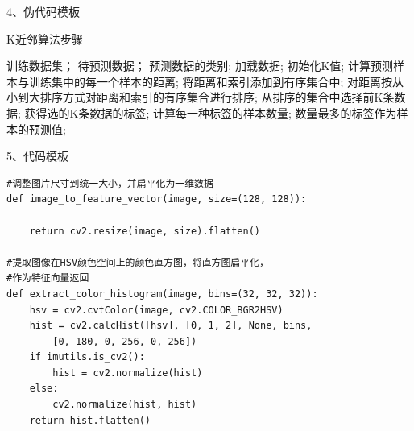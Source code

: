 \documentclass{article}
\begin{document}
\begin{appendices}
4、伪代码模板
 \begin{algorithm}[H]
  \caption{ K近邻算法步骤}
  \begin{algorithmic}[1]
    \Require
      训练数据集；
      待预测数据；
    \Ensure
      预测数据的类别;
    \State 加载数据;
    \State 初始化K值;
    \State 计算预测样本与训练集中的每一个样本的距离;
    \State 将距离和索引添加到有序集合中;
    \State 对距离按从小到大排序方式对距离和索引的有序集合进行排序;
    \State 从排序的集合中选择前K条数据;
    \State 获得选的K条数据的标签;
    \State 计算每一种标签的样本数量;
    \Return 
        数量最多的标签作为样本的预测值;
  \end{algorithmic}
\end{algorithm}


5、代码模板
\lstset{language=Python}
\begin{lstlisting}
#调整图片尺寸到统一大小，并扁平化为一维数据
def image_to_feature_vector(image, size=(128, 128)):

	return cv2.resize(image, size).flatten()

#提取图像在HSV颜色空间上的颜色直方图，将直方图扁平化，
#作为特征向量返回
def extract_color_histogram(image, bins=(32, 32, 32)):
	hsv = cv2.cvtColor(image, cv2.COLOR_BGR2HSV)
	hist = cv2.calcHist([hsv], [0, 1, 2], None, bins,
		[0, 180, 0, 256, 0, 256])
	if imutils.is_cv2():
		hist = cv2.normalize(hist)
	else:
		cv2.normalize(hist, hist)
	return hist.flatten()

\end{lstlisting}
\end{appendices}
\end{document}
